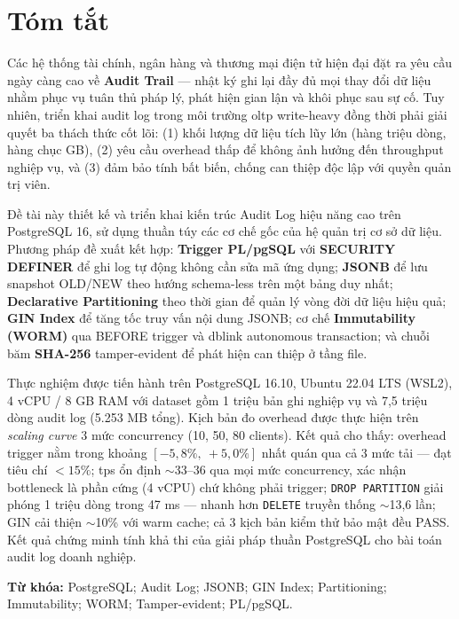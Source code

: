 \chapter*{Tóm tắt}

\begin{sloppypar}
Các hệ thống tài chính, ngân hàng và thương mại điện tử hiện đại đặt ra yêu cầu ngày càng cao về \textbf{Audit Trail} --- nhật ký ghi lại đầy đủ mọi thay đổi dữ liệu nhằm phục vụ tuân thủ pháp lý, phát hiện gian lận và khôi phục sau sự cố. Tuy nhiên, triển khai audit log trong môi trường \ac{oltp} write-heavy đồng thời phải giải quyết ba thách thức cốt lõi: (1) khối lượng dữ liệu tích lũy lớn (hàng triệu dòng, hàng chục GB), (2) yêu cầu overhead thấp để không ảnh hưởng đến throughput nghiệp vụ, và (3) đảm bảo tính bất biến, chống can thiệp độc lập với quyền quản trị viên.

Đề tài này thiết kế và triển khai kiến trúc Audit Log hiệu năng cao trên PostgreSQL 16, sử dụng thuần túy các cơ chế gốc của hệ quản trị cơ sở dữ liệu. Phương pháp đề xuất kết hợp: \textbf{Trigger PL/pgSQL} với \textbf{SECURITY DEFINER} để ghi log tự động không cần sửa mã ứng dụng; \textbf{JSONB} để lưu snapshot OLD/NEW theo hướng schema-less trên một bảng duy nhất; \textbf{Declarative Partitioning} theo thời gian để quản lý vòng đời dữ liệu hiệu quả; \textbf{GIN Index} để tăng tốc truy vấn nội dung JSONB; cơ chế \textbf{Immutability (WORM)} qua BEFORE trigger và dblink autonomous transaction; và chuỗi băm \textbf{SHA-256} tamper-evident để phát hiện can thiệp ở tầng file.

Thực nghiệm được tiến hành trên PostgreSQL 16.10, Ubuntu 22.04 LTS (WSL2), 4 vCPU / 8 GB RAM với dataset gồm 1 triệu bản ghi nghiệp vụ và 7,5 triệu dòng audit log (5.253 MB tổng). Kịch bản đo overhead được thực hiện trên \textit{scaling curve} 3 mức concurrency (10, 50, 80 clients). Kết quả cho thấy: overhead trigger nằm trong khoảng $[-5,8\%,\ +5,0\%]$ nhất quán qua cả 3 mức tải --- đạt tiêu chí $< 15\%$; \ac{tps} ổn định $\sim$33--36 qua mọi mức concurrency, xác nhận bottleneck là phần cứng (4 vCPU) chứ không phải trigger; \texttt{DROP\ PARTITION} giải phóng 1 triệu dòng trong 47 ms --- nhanh hơn \texttt{DELETE} truyền thống $\sim$13,6 lần; GIN cải thiện $\sim$10\% với warm cache; cả 3 kịch bản kiểm thử bảo mật đều PASS. Kết quả chứng minh tính khả thi của giải pháp thuần PostgreSQL cho bài toán audit log doanh nghiệp.

\textbf{Từ khóa:} PostgreSQL; Audit Log; JSONB; GIN Index; Partitioning; Immutability; WORM; Tamper-evident; PL/pgSQL.
\end{sloppypar}
